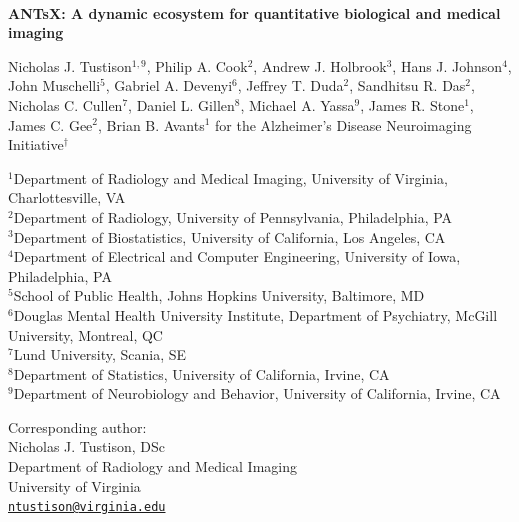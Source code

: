 \documentclass[12pt,]{article}
\author{}
\date{\vspace{-2.5em}}
\begin{document}


\begin{centering}

$ $

\vspace{4.cm}

\LARGE

{\bf ANTsX:  A dynamic ecosystem for quantitative biological and medical imaging}

\vspace{0.5 cm}

\normalsize

Nicholas J. Tustison$^{1,9}$,
Philip A. Cook$^{2}$,
Andrew J. Holbrook$^{3}$,
Hans J. Johnson$^{4}$,
John Muschelli$^{5}$,
Gabriel A. Devenyi$^{6}$,
Jeffrey T. Duda$^{2}$,
Sandhitsu R. Das$^{2}$,
Nicholas C. Cullen$^{7}$,
Daniel L. Gillen$^{8}$,
Michael A. Yassa$^{9}$,
James R. Stone$^{1}$,
James C. Gee$^{2}$,
Brian B. Avants$^{1}$
for the Alzheimer’s Disease Neuroimaging Initiative$^{\dagger}$

\footnotesize

$^{1}$Department of Radiology and Medical Imaging, University of Virginia, Charlottesville, VA \\
$^{2}$Department of Radiology, University of Pennsylvania, Philadelphia, PA \\
$^{3}$Department of Biostatistics, University of California, Los Angeles, CA \\
$^{4}$Department of Electrical and Computer Engineering, University of Iowa, Philadelphia, PA \\
$^{5}$School of Public Health, Johns Hopkins University, Baltimore, MD \\
$^{6}$Douglas Mental Health University Institute, Department of Psychiatry, McGill University, Montreal, QC \\
$^{7}$Lund University, Scania, SE \\
$^{8}$Department of Statistics, University of California, Irvine, CA \\
$^{9}$Department of Neurobiology and Behavior, University of California, Irvine, CA \\

\end{centering}

\vspace{4.5 cm}

\scriptsize

Corresponding author:\\
Nicholas J. Tustison, DSc\\
Department of Radiology and Medical Imaging\\
University of Virginia\\
\href{mailto:ntustison@virginia.edu}{\nolinkurl{ntustison@virginia.edu}}
\end{document}
